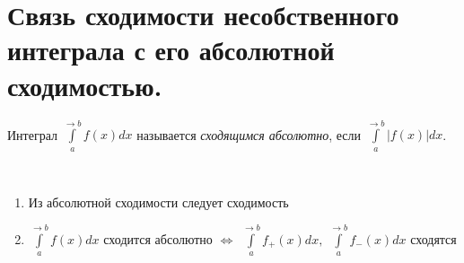 \documentclass[../main.tex]{subfiles}
\begin{document}
\newpage
\section{Связь сходимости несобственного интеграла с его абсолютной сходимостью.}
Интеграл \( \displaystyle\int\limits_{ a}^{ \rightarrow b} f\left( x\right)dx\) называется \emph{сходящимся абсолютно}, если \( \displaystyle\int\limits_{ a}^{ \rightarrow b } \left| f\left( x\right)\right|dx\).

\begin{thm}
    
    ~

    \begin{enumerate}
        \item Из абсолютной сходимости следует сходимость
        \item \( \displaystyle\int\limits_{ a}^{ \rightarrow b} f\left( x\right)dx\) сходится абсолютно \( \Longleftrightarrow\) \( \displaystyle\int\limits_{ a}^{ \rightarrow b} f_+\left( x\right)dx, \;\displaystyle\int\limits_{ a}^{ \rightarrow b} f_-\left( x\right)dx\) сходятся
    \end{enumerate}
\end{thm}
\end{document}
